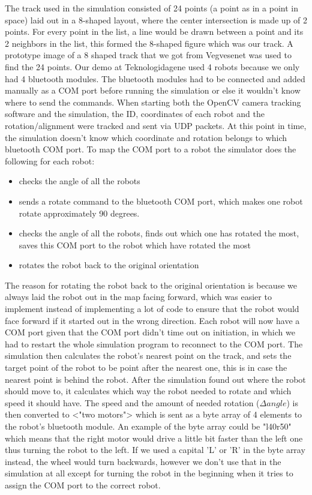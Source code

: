 The track used in the simulation consisted of 24 points (a point as in a point in space) laid out in a 8-shaped layout, where the center intersection is made up of 2 points. For every point in the list, a line would be drawn between a point and its 2 neighbors in the list, this formed the 8-shaped figure which was our track.
A prototype image of a 8 shaped track that we got from Vegvesenet was used to find the 24 points. 
Our demo at Teknologidagene used 4 robots because we only had 4 bluetooth modules. The bluetooth modules had to be connected and added manually as a COM port before running the simulation or else it wouldn't know where to send the commands. When starting both the OpenCV camera tracking software and the simulation, the ID, coordinates of each robot and the rotation/alignment were tracked and sent via UDP packets. At this point in time, the simulation doesn't know which coordinate and rotation belongs to which bluetooth COM port. To map the COM port to a robot the simulator does the following for each robot:
\begin{itemize}
    \item checks the angle of all the robots
    \item sends a rotate command to the bluetooth COM port, which makes one robot rotate approximately 90 degrees.
    \item checks the angle of all the robots, finds out which one has rotated the most, saves this COM port to the robot which have rotated the most
    \item rotates the robot back to the original orientation
\end{itemize}
The reason for rotating the robot back to the original orientation is because we always laid the robot out in the map facing forward, which was easier to implement instead of implementing a lot of code to ensure that the robot would face forward if it started out in the wrong direction.
Each robot will now have a COM port given that the COM port didn't time out on initiation, in which we had to restart the whole simulation program to reconnect to the COM port.
The simulation then calculates the robot's nearest point on the track, and sets the target point of the robot to be point after the nearest one, this is in case the nearest point is behind the robot. After the simulation found out where the robot should move to, it calculates which way the robot needed to rotate and which speed it should have. The speed and the amount of needed rotation ($\Delta angle$) is then converted to <"two motors"> which is sent as a byte array of 4 elements to the robot's bluetooth module. An example of the byte array could be "l40r50" which means that the right motor would drive a little bit faster than the left one thus turning the robot to the left.
If we used a capital 'L' or 'R' in the byte array instead, the wheel would turn backwards, however we don't use that in the simulation at all except for turning the robot in the beginning when it tries to assign the COM port to the correct robot.

